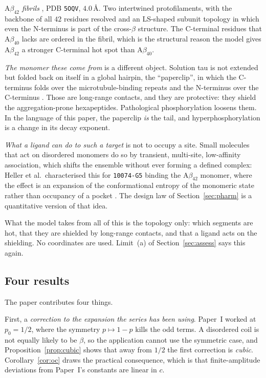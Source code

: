 \documentclass[11pt,reqno]{amsart}
\theoremstyle{plain}
\theoremstyle{definition}
\theoremstyle{remark}
\numberwithin{equation}{section}
\newcommand{\Ab}{\mathrm{A}\beta}
\begin{document}
\emph{$\Ab_{42}$ fibrils} \cite{Gremer2017}, PDB \texttt{5OQV}, $4.0$\,\AA. Two intertwined protofilaments, with the backbone of all $42$ residues resolved and an LS-shaped subunit topology in which even the N-terminus is part of the cross-$\beta$ structure. The C-terminal residues that $\Ab_{40}$ lacks are ordered in the fibril, which is the structural reason the model gives $\Ab_{42}$ a stronger C-terminal hot spot than $\Ab_{40}$.

\emph{The monomer these come from} is a different object. Solution tau is not extended but folded back on itself in a global hairpin, the ``paperclip'', in which the C-terminus folds over the microtubule-binding repeats and the N-terminus over the C-terminus \cite{Jeganathan2006}. Those are long-range contacts, and they are protective: they shield the aggregation-prone hexapeptides. Pathological phosphorylation loosens them. In the language of this paper, the paperclip \emph{is} the tail, and hyperphosphorylation is a change in its decay exponent.

\emph{What a ligand can do to such a target} is not to occupy a site. Small molecules that act on disordered monomers do so by transient, multi-site, low-affinity association, which shifts the ensemble without ever forming a defined complex: Heller et al.\ characterised this for \texttt{10074-G5} binding the $\Ab_{42}$ monomer, where the effect is an expansion of the conformational entropy of the monomeric state rather than occupancy of a pocket \cite{Heller2020}. The design law of Section~\ref{sec:pharm} is a quantitative version of that idea.

What the model takes from all of this is the topology only: which segments are hot, that they are shielded by long-range contacts, and that a ligand acts on the shielding. No coordinates are used. Limit~(a) of Section~\ref{sec:assess} says this again.

\subsection{Four results}
The paper contributes four things.

First, a \emph{correction to the expansion the series has been using}. Paper~I worked at $p_0=1/2$, where the symmetry $p\mapsto1-p$ kills the odd terms. A disordered coil is not equally likely to be $\beta$, so the application cannot use the symmetric case, and Proposition~\ref{prop:cubic} shows that away from $1/2$ the first correction is \emph{cubic}. Corollary~\ref{cor:oc} draws the practical consequence, which is that finite-amplitude deviations from Paper~I's constants are linear in $c$.
\end{document}
